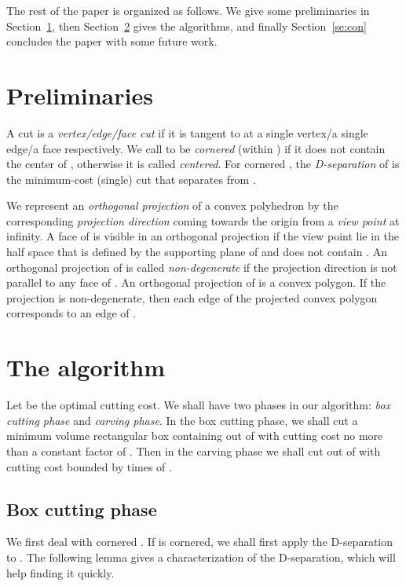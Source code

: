 \documentclass{llncs}
\begin{document}
The rest of the paper is organized as follows.
We give some preliminaries in Section~\ref{se:pre}, 
then Section~\ref{se:algo} gives the algorithms, and finally Section~\ref{se:con} concludes the paper 
with some future work.


\section{Preliminaries}
\label{se:pre}
A cut is a \emph{vertex/edge/face cut} if it is tangent to  at a single vertex/a single edge/a face respectively.
We call  to be \emph{cornered} (within ) if it does not contain the center  of , otherwise it is called \emph{centered}.
For cornered , the \emph{D-separation} of  is the minimum-cost (single) cut that separates  from .



We represent an \emph{orthogonal projection} of a convex polyhedron  by the corresponding 
\emph{projection direction} coming towards the origin from a \emph{view point} at infinity. 
A face  of  is visible in an orthogonal projection if the view point
lie in the half space that is defined by the supporting plane of  and does not contain .
An orthogonal projection of  is called  \emph{non-degenerate}
if the projection direction is not parallel to any face of .
An orthogonal projection of  is a convex polygon.
If the projection is non-degenerate, then each edge of the projected convex polygon corresponds to an edge of . 



\section{The algorithm} 
\label{se:algo}
Let  be the optimal cutting cost.
We shall have two phases in our algorithm: \emph{box cutting phase} and \emph{carving phase}.
In the box cutting phase, we shall cut a minimum volume rectangular box  containing  out of 
with cutting cost no more than a constant factor of .
Then in the carving phase we shall cut  out of  with cutting cost bounded by  times of .


\subsection{Box cutting phase} 
We first deal with cornered .
If  is cornered, we shall first apply the D-separation to .
The following lemma gives a characterization of the D-separation, which will help finding it quickly.
\end{document}
